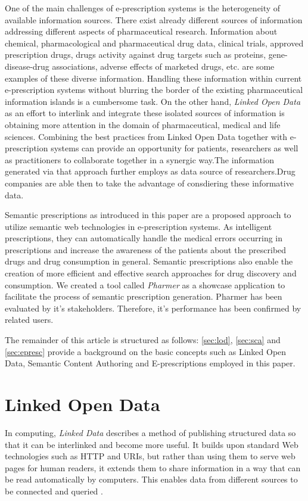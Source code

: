 \documentclass[10pt, conference, compsocconf]{IEEEtran}
\begin{document}
One of the main challenges of e-prescription systems is the heterogeneity of available information sources.
There exist already different sources of information addressing different aspects of pharmaceutical research.
Information about chemical, pharmacological and pharmaceutical drug data, clinical trials, approved prescription drugs, drugs activity against drug targets such as proteins, gene-disease-drug associations, adverse effects of marketed drugs, etc. are some examples of these diverse information.
Handling these information within current e-prescription systems without blurring the border of the existing pharmaceutical information islands is a cumbersome task.
On the other hand, \emph{Linked Open Data} as an effort to interlink and integrate these isolated sources of information is obtaining more attention in the domain of pharmaceutical, medical and life sciences.
Combining the best practices from Linked Open Data together with e-prescription systems can provide an opportunity for patients, researchers as well as practitioners to collaborate together in a synergic way.The information generated via that approach further employs as data source of researchers.Drug companies are able then to take the advantage of consdiering these informative data.

Semantic prescriptions as introduced in this paper are a proposed approach to utilize semantic web technologies in e-prescription systems.
As intelligent prescriptions, they can automatically handle the medical errors occurring in prescriptions and increase the awareness of the patients about the prescribed drugs and drug consumption in general.
Semantic prescriptions also enable the creation of more efficient and effective search approaches for drug discovery and consumption.
We created a tool called \emph{Pharmer} as a showcase application to facilitate the process of semantic prescription generation.
{Pharmer} has been evaluated by it's stakeholders. Therefore, it's performance has been confirmed by related users.

The remainder of this article is structured as follows:
\autoref{sec:lod}, \autoref{sec:sca} and \autoref{sec:epresc} provide a background on the basic concepts such as Linked Open Data, Semantic Content Authoring and E-prescriptions employed in this paper.


\section{Linked Open Data}
\label{sec:lod}
In computing, \emph{Linked Data} describes a method of publishing structured data so that it can be interlinked and become more useful.
It builds upon standard Web technologies such as HTTP and URIs, but rather than using them to serve web pages for human readers, it extends them to share information in a way that can be read automatically by computers.
This enables data from different sources to be connected and queried \cite{linkeddata}.
\end{document}
